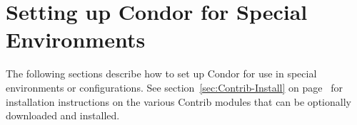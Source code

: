 \section{\label{sec:special-environments}Setting up Condor for Special
Environments} 

The following sections describe how to set up Condor for use in
special environments or configurations.
See section~\ref{sec:Contrib-Install} on
page~\pageref{sec:Contrib-Install} for installation instructions on
the various Contrib modules that can be optionally downloaded and
installed.











